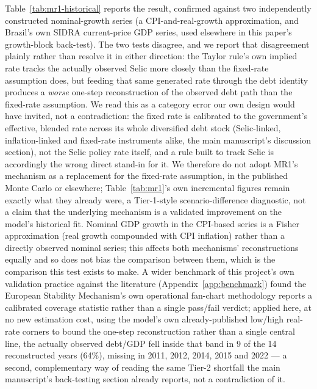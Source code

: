\documentclass[11pt,a4paper]{article}
\begin{document}
Table~\ref{tab:mr1-historical} reports the result, confirmed against two independently constructed nominal-growth series (a CPI-and-real-growth approximation, and Brazil's own SIDRA current-price GDP series, used elsewhere in this paper's growth-block back-test). The two tests disagree, and we report that disagreement plainly rather than resolve it in either direction: the Taylor rule's own implied rate tracks the actually observed Selic more closely than the fixed-rate assumption does, but feeding that same generated rate through the debt identity produces a \emph{worse} one-step reconstruction of the observed debt path than the fixed-rate assumption. We read this as a category error our own design would have invited, not a contradiction: the fixed rate is calibrated to the government's effective, blended rate across its whole diversified debt stock (Selic-linked, inflation-linked and fixed-rate instruments alike, the main manuscript's discussion section), not the Selic policy rate itself, and a rule built to track Selic is accordingly the wrong direct stand-in for it. We therefore do not adopt MR1's mechanism as a replacement for the fixed-rate assumption, in the published Monte Carlo or elsewhere; Table~\ref{tab:mr1}'s own incremental figures remain exactly what they already were, a Tier-1-style scenario-difference diagnostic, not a claim that the underlying mechanism is a validated improvement on the model's historical fit. Nominal GDP growth in the CPI-based series is a Fisher approximation (real growth compounded with CPI inflation) rather than a directly observed nominal series; this affects both mechanisms' reconstructions equally and so does not bias the comparison between them, which is the comparison this test exists to make. A wider benchmark of this project's own validation practice against the literature (Appendix~\ref{app:benchmark}) found the European Stability Mechanism's own operational fan-chart methodology reports a calibrated coverage statistic rather than a single pass/fail verdict; applied here, at no new estimation cost, using the model's own already-published low/high real-rate corners to bound the one-step reconstruction rather than a single central line, the actually observed debt/GDP fell inside that band in 9 of the 14 reconstructed years (64\%), missing in 2011, 2012, 2014, 2015 and 2022 --- a second, complementary way of reading the same Tier-2 shortfall the main manuscript's back-testing section already reports, not a contradiction of it.

\begin{table}[htbp]
\centering\small
\caption{MR1 against history: one-step debt/GDP reconstruction error and nominal-Selic tracking error, fixed-rate vs.\ Taylor-rule mechanism, 2000--2024 (RMSE, percentage points).}
\label{tab:mr1-historical}
\end{table}
\end{document}
